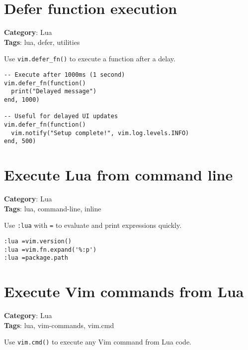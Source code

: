 {{{{{{\section{Defer function execution}

\textbf{Category}: Lua\\ \textbf{Tags}: lua, defer, utilities
\vspace{0.5cm}

Use {\footnotesize \Verb§vim.defer_fn()§} to execute a function after a delay.

\begin{Exa*}{}
\begin{Verbatim}[fontsize=\footnotesize, breaklines, breakanywhere]
-- Execute after 1000ms (1 second)
vim.defer_fn(function()
  print("Delayed message")
end, 1000)

-- Useful for delayed UI updates
vim.defer_fn(function()
  vim.notify("Setup complete!", vim.log.levels.INFO)
end, 500)
\end{Verbatim}
\end{Exa*}

\section{Execute Lua from command line}

\textbf{Category}: Lua\\ \textbf{Tags}: lua, command-line, inline
\vspace{0.5cm}

Use {\footnotesize \Verb§:lua§} with {\footnotesize \Verb§=§} to evaluate and print expressions quickly.

\begin{Exa*}{}
\begin{Verbatim}[fontsize=\footnotesize, breaklines, breakanywhere]
:lua =vim.version()
:lua =vim.fn.expand('%:p')
:lua =package.path
\end{Verbatim}
\end{Exa*}

\section{Execute Vim commands from Lua}

\textbf{Category}: Lua\\ \textbf{Tags}: lua, vim-commands, vim.cmd
\vspace{0.5cm}

Use {\footnotesize \Verb§vim.cmd()§} to execute any Vim command from Lua code.

}}}}}}
